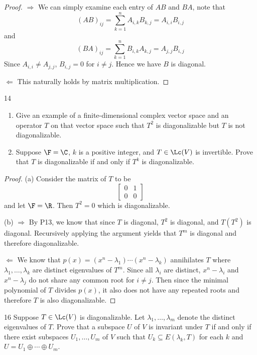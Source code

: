 \documentclass{extarticle}
\begin{document}
\begin{proof}
\(\Rightarrow\) We can simply examine each entry of \(AB\) and \(BA\), note that 
\[(AB)_{ij} = \sum_{k=1}^{n}A_{i, k}B_{k, j} = A_{i, i} B_{i, j}\]
and 
\[(BA)_{ij} = \sum_{k=1}^{n}B_{i, k}A_{k, j} = A_{j, j} B_{i, j}\]
Since \(A_{i, i} \neq A_{j, j}\), \(B_{i, j} = 0\) for \(i \neq j\). Hence we have \(B\) is diagonal. 

\(\Leftarrow\) This naturally holds by matrix multiplication. 
\end{proof}

\begin{problem}{14}
    \begin{enumerate}[label=(\alph*)]
        \item Give an example of a finite-dimensional complex vector space and an operator \(T\) on 
        that vector space such that \(T^2\) is diagonalizable but \(T\) is not diagonalizable. 
        \item Suppose \(\F = \C\), \(k\) is a positive integer, and \(T \in \Lc(V)\) is invertible. 
        Prove that \(T\) is diagonalizable if and only if \(T^k\) is diagonalizable.
    \end{enumerate}
\end{problem}

\begin{proof}
(a) Consider the matrix of \(T\) to be 
\[\begin{bmatrix}
    0 & 1 \\ 
    0 & 0
\end{bmatrix}\]
and let \(\F = \R\). Then \(T^2 = 0\) which is diagonalizable.

(b) \(\Rightarrow\) By P13, we know that since \(T\) is diagonal, \(T^2\) is diagonal, and 
\(T(T^2)\) is diagonal. Recursively applying the argument yields that \(T^m\) is diagonal and therefore 
diagonalizable. 

\(\Leftarrow\) We know that \(p(x) = (x^n - \lambda_1)\cdots(x^n - \lambda_k)\) annihilates \(T\) where 
\(\lambda_1, \ldots, \lambda_k\) are distinct eigenvalues of \(T^m\). Since all \(\lambda_i\) are distinct, 
\(x^n - \lambda_i\) and \(x^n - \lambda_j\) do not share any common root for \(i \neq j\). Then since the 
minimal polynomial of \(T\) divides \(p(x)\), it also does not have any repeated roots and therefore \(T\) 
is also diagonalizable. 
\end{proof}

\begin{problem}{16}
    Suppose \(T \in \Lc(V)\) is diagonalizable. Let \(\lambda_1, \ldots, \lambda_m\) denote the distinct 
    eigenvalues of \(T\). Prove that a subspace \(U\) of \(V\) is invariant under \(T\) if and only if 
    there exist subspaces \(U_1, \ldots, U_m\) of \(V\) such that \(U_k \subseteq E(\lambda_k, T)\) for 
    each \(k\) and \(U = U_1 \oplus \cdots \oplus U_m\). 
\end{problem}
\end{document}
